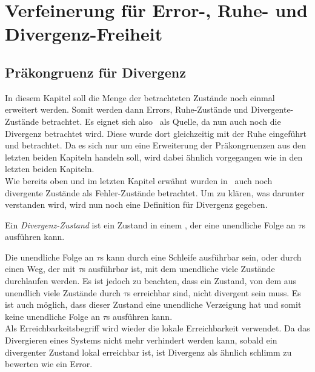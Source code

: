 \chapter{Verfeinerung für Error-, Ruhe- und Divergenz-Freiheit}

\section{Präkongruenz für Divergenz}

In diesem Kapitel soll die Menge der betrachteten Zustände noch einmal
erweitert werden. Somit werden dann Errors, Ruhe-Zustände und
Divergente-Zustände betrachtet. Es eignet sich also~\cite{Chilton2013} als
Quelle, da nun auch noch die Divergenz betrachtet wird. Diese wurde dort
gleichzeitig mit der Ruhe eingeführt und betrachtet. Da es sich nur um eine
Erweiterung der Präkongruenzen aus den letzten beiden Kapiteln handeln soll, wird
dabei ähnlich vorgegangen wie in den letzten beiden Kapiteln.\\
Wie bereits oben und im letzten Kapitel erwähnt wurden in~\cite{Chilton2013}
auch noch divergente Zustände als Fehler-Zustände betrachtet. Um zu klären, was
darunter verstanden wird, wird nun noch eine Definition für Divergenz gegeben.

\begin{Def}[Divergenz]
  Ein \emph{Divergenz-Zustand} ist ein Zustand in einem \EIO{}, der eine
  unendliche Folge an $\tau$s ausführen kann.%
\end{Def}

Die unendliche Folge an $\tau$s kann durch eine Schleife ausführbar sein, oder
durch einen Weg, der mit $\tau$s ausführbar ist, mit dem
unendliche viele Zustände durchlaufen werden. Es ist jedoch zu beachten, dass
ein Zustand, von dem aus unendlich viele Zustände durch $\tau$s erreichbar sind,
nicht divergent sein muss. Es ist auch möglich, dass dieser Zustand eine
unendliche Verzeigung hat und somit keine unendliche Folge an $\tau$s ausführen
kann.\\
Als Erreichbarkeitsbegriff wird wieder die lokale Erreichbarkeit verwendet.
Da das Divergieren eines Systems nicht mehr verhindert werden kann, sobald ein
divergenter Zustand lokal erreichbar ist, ist Divergenz als ähnlich
\glqq{}schlimm\grqq{} zu bewerten wie ein Error.

